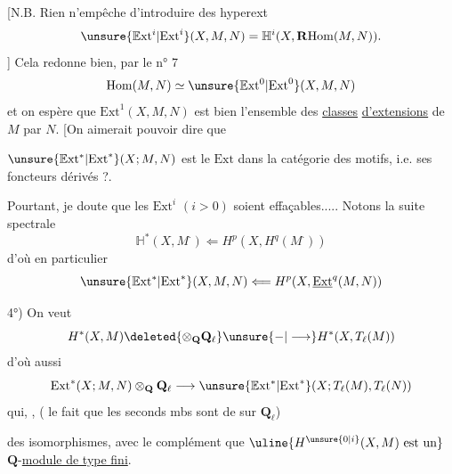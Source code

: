 [N.B. Rien n'empêche d'introduire des hyperext
\[
\unsure{\mathbb{E}\mathrm{xt}^i|\mathrm{Ext}^i}(X,M,N)=\mathbb{H}^i(X,\mathbf{R}\mathrm{Hom}(M,N)).
\]
]
Cela redonne bien, par le n° 7
\[
\mathrm{Hom}(M,N)\simeq\unsure{\mathbb{E}\mathrm{xt}^0|\mathrm{Ext}^0}(X,M,N)
\]
et on espère que $\mathrm{Ext}^1(X,M,N)$ est bien l'ensemble des \uline{classes} \uline{d'extensions} de $M$ par $N$. [On aimerait pouvoir dire que

$\unsure{\mathbb{E}\mathrm{xt}^*|\mathrm{Ext}^*}(X;M,N)$ est le  $\mathrm{Ext}$ dans la catégorie des motifs, i.e. ses foncteurs dérivés ?.

Pourtant, je doute que les $\mathrm{Ext}^i$ $(i>0)$ soient effaçables.....
Notons la suite spectrale
\[
\mathbb{H}^*(X,M^\cdot)\Longleftarrow H^p(X,H^q(M^\cdot))
\]
d'où en particulier
\[
\unsure{\mathbb{E}\mathrm{xt}^*|\mathrm{Ext}^*}(X,M,N)\Longleftarrow H^p(X,\underline{\mathrm{Ext}}^q(M,N))
\]

4°) On veut  
\[
H^*(X,M)\deleted{\otimes_{\mathbf{Q}}\mathbf{Q}_\ell}\unsure{-|\longrightarrow} H^*(X,T_\ell(M))
\]
d'où aussi
\[
\mathrm{Ext}^*(X;M,N)\otimes_{\mathbf{Q}}\mathbf{Q}_\ell\longrightarrow \unsure{\mathbb{E}\mathrm{xt}^*|\mathrm{Ext}^*}(X;T_\ell(M),T_\ell(N))
\]
qui,  ,  ( le fait que les seconds mbs sont de  sur $\mathbf{Q}_\ell$)

 des isomorphismes, avec le complément que $\uline{H^{\unsure{0|i}}(X,M)\text{ est un}}$ $\mathbf{Q}$-\uline{module de type fini}.


